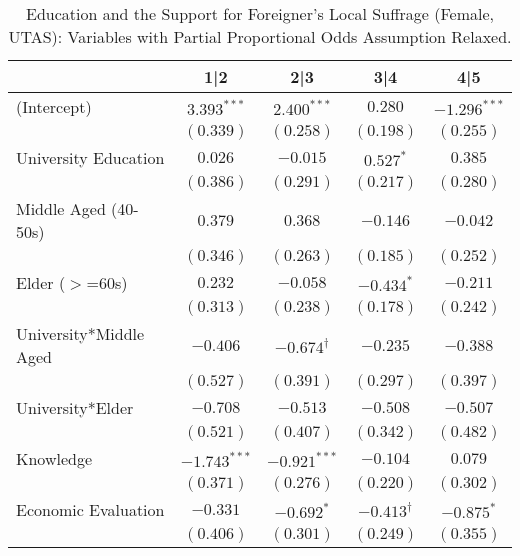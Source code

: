 
\begin{table}
\caption{Education and the Support for Foreigner's Local Suffrage (Female, UTAS): Variables with Partial Proportional Odds Assumption Relaxed.}
\begin{center}
\begin{tabular}{l c c c c }
\toprule
 & 1|2 & 2|3 & 3|4 & 4|5 \\
\midrule
(Intercept)            & $3.393^{***}$  & $2.400^{***}$      & $0.280$            & $-1.296^{***}$ \\
                       & $(0.339)$      & $(0.258)$          & $(0.198)$          & $(0.255)$      \\
University Education   & $0.026$        & $-0.015$           & $0.527^{*}$        & $0.385$        \\
                       & $(0.386)$      & $(0.291)$          & $(0.217)$          & $(0.280)$      \\
Middle Aged (40-50s)   & $0.379$        & $0.368$            & $-0.146$           & $-0.042$       \\
                       & $(0.346)$      & $(0.263)$          & $(0.185)$          & $(0.252)$      \\
Elder ($>$=60s)        & $0.232$        & $-0.058$           & $-0.434^{*}$       & $-0.211$       \\
                       & $(0.313)$      & $(0.238)$          & $(0.178)$          & $(0.242)$      \\
University*Middle Aged & $-0.406$       & $-0.674^{\dagger}$ & $-0.235$           & $-0.388$       \\
                       & $(0.527)$      & $(0.391)$          & $(0.297)$          & $(0.397)$      \\
University*Elder       & $-0.708$       & $-0.513$           & $-0.508$           & $-0.507$       \\
                       & $(0.521)$      & $(0.407)$          & $(0.342)$          & $(0.482)$      \\
Knowledge              & $-1.743^{***}$ & $-0.921^{***}$     & $-0.104$           & $0.079$        \\
                       & $(0.371)$      & $(0.276)$          & $(0.220)$          & $(0.302)$      \\
Economic Evaluation    & $-0.331$       & $-0.692^{*}$       & $-0.413^{\dagger}$ & $-0.875^{*}$   \\
                       & $(0.406)$      & $(0.301)$          & $(0.249)$          & $(0.355)$      \\

\end{tabular}
\end{center}
\end{table}
